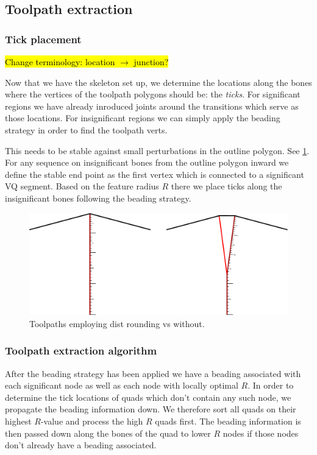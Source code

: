 \subsection{Toolpath extraction}
\label{section_toolpath_extraction}

\subsubsection{Tick placement}
\hl{Change terminology: location $\to$ junction?}

Now that we have the skeleton set up, we determine the locations along the bones where the vertices of the toolpath polygons should be: the \emph{ticks}.
For significant regions we have already inroduced joints around the transitions which serve as those locations.
For insignificant regions we can simply apply the beading strategy in order to find the toolpath verts.


This needs to be stable against small perturbations in the outline polygon.
See \cref{heterogeneous_joint_generation}.
For any sequence on insignificant bones from the outline polygon inward we define the stable end point as the first vertex which is connected to a significant VQ segment.
Based on the feature radius $R$ there we place ticks along the insignificant bones following the beading strategy.

\begin{figure}
\includegraphics[width=\columnwidth]{sources/method/heterogeneous_joint_generation.pdf}
\caption{Toolpaths employing dist rounding vs without.}
\label{heterogeneous_joint_generation}
\end{figure}





\subsubsection{Toolpath extraction algorithm}
After the beading strategy has been applied we have a beading associated with each significant node as well as each node with locally optimal $R$.
In order to determine the tick locations of quads which don't contain any such node, we propagate the beading information down.
We therefore sort all quads on their highest $R$-value and process the high $R$ quads first.
The beading information is then passed down along the bones of the quad to lower $R$ nodes if those nodes don't already have a beading associated.

